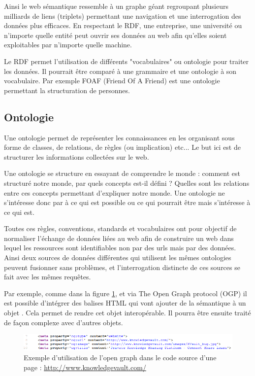 Ainsi le web sémantique ressemble à un graphe géant regroupant plusieurs milliards de liens (triplets) permettant une navigation et une interrogation des données plus efficaces. En respectant le RDF, une entreprise, une université ou n'importe quelle entité peut ouvrir ses données au web afin qu'elles soient exploitables par n'importe quelle machine.

Le RDF permet l'utilisation de différents "vocabulaires" ou ontologie pour traiter les données. Il pourrait être comparé à une grammaire et une ontologie à son vocabulaire. Par exemple FOAF (Friend Of A Friend) est une ontologie permettant la structuration de personnes. \cite{foaf}

\subsection{Ontologie}

Une ontologie permet de représenter les connaissances en les organisant sous forme de classes, de relations, de règles (ou implication) etc... Le but ici est de structurer les informations collectées sur le web.

Une ontologie se structure en essayant de comprendre le monde : comment est structuré notre monde, par quels concepts est-il défini ? Quelles sont les relations entre ces concepts permettant d'expliquer notre monde. Une ontologie ne s'intéresse donc par à ce qui est possible ou ce qui pourrait être mais s'intéresse à ce qui est. \cite{shirky} \cite{schema}

Toutes ces règles, conventions, standards et vocabulaires ont pour objectif de normaliser l'échange de données liées au web afin de construire un web dans lequel les ressources sont identifiables non par des urls mais par des données. Ainsi deux sources de données différentes qui utilisent les mêmes ontologies peuvent fusionner sans problèmes, et l'interrogation distincte de ces sources se fait avec les mêmes requêtes.

Par exemple, comme dans la figure \ref{fig1}, et via The Open Graph protocol (OGP) il est possible d'intégrer des balises HTML qui vont ajouter de la sémantique à un objet \cite{ogp}. Cela permet de rendre cet objet interopérable. Il pourra être ensuite traité de façon complexe avec d'autres objets.

\begin{figure}[ht]
\centering
\includegraphics[width=\textwidth, draft=false]{imgs/og_example.PNG}
\caption{Exemple d'utilisation de l'open graph dans le code source d'une page : \url{http://www.knowledgevault.com/}}
\label{fig1}
\end{figure}

